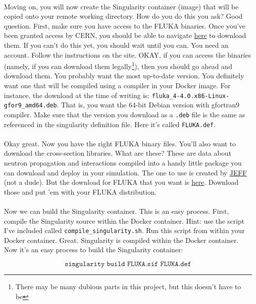     \paragraph{}
    Moving on, you will now create the Singularity container (image) that will be copied onto your remote working directory. How do you do this you ask? Good question. First, make sure you have access to the FLUKA binaries. Once you've been granted access by CERN, you should be able to navigate \href{https://fluka.cern/download/latest-fluka-release}{here} to download them. If you can't do this yet, you should wait until you can. You need an account. Follow the instructions on the site. OKAY, if you can access the binaries (namely, if you can download them legally\footnote{There may be many dubious parts in this project, but this doesn't have to be}), then you should go ahead and download them. You probably want the most up-to-date version. You definitely want one that will be compiled using a compiler in your Docker image. For instance, the download at the time of writing is: \texttt{fluka\_4-4.0.x86-Linux-gfor9\_amd64.deb}. That is, you want the 64-bit Debian version with gfortran9 compiler. Make sure that the version you download as a \texttt{.deb} file is the same as referenced in the singularity definition file. Here it's called \texttt{FLUKA.def}. 

    \paragraph{}
    Okay great. Now you have the right FLUKA binary files. You'll also want to download the cross-section libraries. What are these? These are data about neutron propagation and interactions compiled into a handy little package you can download and deploy in your simulation. The one to use is created by \href{https://www.oecd-nea.org/dbdata/jeff/jeff33/}{JEFF} (not a dude). But the download for FLUKA that you want is \href{https://fluka.cern/download/neutron-data-libraries}{here}. Download those and put 'em with your FLUKA distribution.

    \paragraph{}
    Now we can build the Singularity container. This is an easy process. First, compile the Singularity source within the Docker container. Hint: use the script I've included called \texttt{compile\_singularity.sh}. Run this script from within your Docker container. Great. Singularity is compiled within the Docker container. Now it's an easy process to build the Singularity container:

    \[\texttt{singularity build FLUKA.sif FLUKA.def}\]

